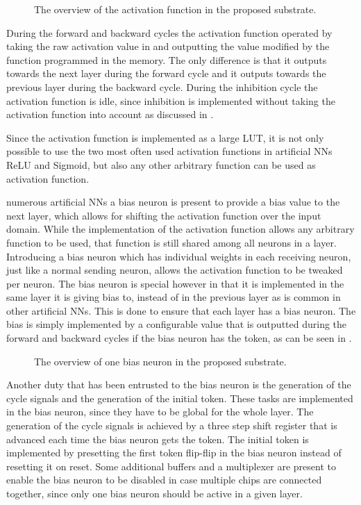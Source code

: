 \begin{figure}[!ht]
  \centering
  
  \caption{The overview of the activation function in the proposed substrate.}
  \label{fig:activation}
\end{figure}

During the forward and backward cycles the activation function operated by taking the raw activation value in and outputting the value modified by the function programmed in the memory. The only difference is that it outputs towards the next layer during the forward cycle and it outputs towards the previous layer during the backward cycle. During the inhibition cycle the activation function is idle, since inhibition is implemented without taking the activation function into account as discussed in .

Since the activation function is implemented as a large \ac{LUT}, it is not only possible to use the two most often used activation functions in artificial \acp{NN} \ac{ReLU} and Sigmoid\cite{8192463}, but also any other arbitrary function can be used as activation function.

 numerous artificial \acp{NN} a bias neuron is present to provide a bias value to the next layer, which allows for shifting the activation function over the input domain. While the implementation of the activation function allows any arbitrary function to be used, that function is still shared among all neurons in a layer. Introducing a bias neuron which has individual weights in each receiving neuron, just like a normal sending neuron, allows the activation function to be tweaked per neuron. The bias neuron is special however in that it is implemented in the same layer it is giving bias to, instead of in the previous layer as is common in other artificial \acp{NN}. This is done to ensure that each layer has a bias neuron. The bias is simply implemented by a configurable value that is outputted during the forward and backward cycles if the bias neuron has the token, as can be seen in .

\begin{figure}[!ht]
  \centering
  
  \caption{The overview of one bias neuron in the proposed substrate.}
  \label{fig:bias}
\end{figure}

Another duty that has been entrusted to the bias neuron is the generation of the cycle signals and the generation of the initial token. These tasks are implemented in the bias neuron, since they have to be global for the whole layer. The generation of the cycle signals is achieved by a three step shift register that is advanced each time the bias neuron gets the token. The initial token is implemented by presetting the first token flip-flip in the bias neuron instead of resetting it on reset. Some additional buffers and a multiplexer are present to enable the bias neuron to be disabled in case multiple chips are connected together, since only one bias neuron should be active in a given layer.

